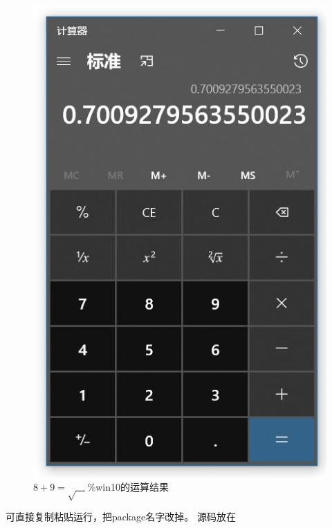 \documentclass{ctexart}
\begin{document}
\begin{figure}[htbp]
    \centering
    \caption{$8+9=\sqrt{\quad}\%$win10的运算结果}\label{fig:4}
    \includegraphics[scale=1.2]{6.jpg} 
\end{figure}
\newpage
可直接复制粘贴运行，把package名字改掉。
{\kaishu {} 源码放在}
\end{document}
